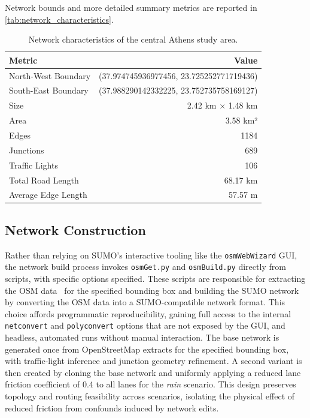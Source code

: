 Network bounds and more detailed summary metrics are reported in \autoref{tab:network_characteristics}.

\begin{table}[htbp]
    \centering
    \caption{Network characteristics of the central Athens study area.}
    \label{tab:network_characteristics}
    \begin{tabular}{lr}
        \toprule
        \textbf{Metric} & \textbf{Value} \\
        \midrule
        North-West Boundary & (37.974745936977456, 23.725252771719436) \\
        South-East Boundary & (37.988290142332225, 23.752735758169127) \\
        Size & 2.42 km $\times$ 1.48 km \\
        Area & 3.58 km² \\
        Edges & 1184 \\
        Junctions & 689 \\
        Traffic Lights & 106 \\
        Total Road Length & 68.17 km \\
        Average Edge Length & 57.57 m \\
        \bottomrule
    \end{tabular}
\end{table}

\subsection{Network Construction}

Rather than relying on SUMO's interactive tooling like the \texttt{osmWebWizard} GUI, the network build process invokes \texttt{osmGet.py} and \texttt{osmBuild.py} directly from scripts, with specific options specified.
These scripts are responsible for extracting the OSM data~\cite{osm2025} for the specified bounding box and building the SUMO network by converting the OSM data into a SUMO-compatible network format.
This choice affords programmatic reproducibility, gaining full access to the internal \texttt{netconvert} and \texttt{polyconvert} options that are not exposed by the GUI, and headless, automated runs without manual interaction.
The base network is generated once from OpenStreetMap extracts for the specified bounding box, with traffic-light inference and junction geometry refinement.
A second variant is then created by cloning the base network and uniformly applying a reduced lane friction coefficient of 0.4 to all lanes for the \emph{rain} scenario.
This design preserves topology and routing feasibility across scenarios, isolating the physical effect of reduced friction from confounds induced by network edits.

